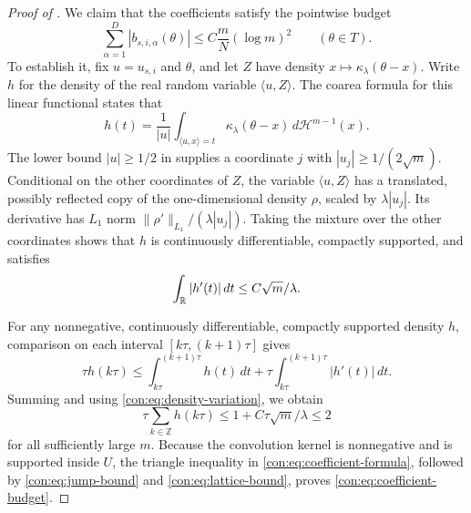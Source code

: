 \begin{proof}[Proof of ]
We claim that the coefficients satisfy the pointwise budget
\begin{equation}
  \sum_{\alpha=1}^D|b_{s,i,\alpha}(\theta)|
       \le C\frac{m}{N}(\log m)^2
       \qquad(\theta\in T).
  \label{con:eq:coefficient-budget}
\end{equation}
To establish it, fix $u=u_{s,i}$ and $\theta$, and let $Z$ have density
$x\mapsto\kappa_\lambda(\theta-x)$. Write $h$ for the density of the
real random variable $\langle u,Z\rangle$. The coarea formula for this
linear functional states that
\[
  h(t)=\frac{1}{|u|}
       \int_{\langle u,x\rangle=t}
       \kappa_\lambda(\theta-x)\,d\mathcal H^{m-1}(x).
\]
The lower bound $|u|\ge1/2$ in  supplies a coordinate
$j$ with $|u_j|\ge1/(2\sqrt m)$. Conditional on the other coordinates of
$Z$, the variable $\langle u,Z\rangle$ has a translated, possibly
reflected copy of the one-dimensional density $\rho$, scaled by
$\lambda|u_j|$. Its derivative has $L_1$ norm
$\|\rho'\|_{L_1}/(\lambda|u_j|)$. Taking the mixture over the other
coordinates shows that $h$ is continuously differentiable, compactly
supported, and satisfies
\begin{equation}
  \int_\mathbb R|h'(t)|\,dt\le C\sqrt m/\lambda.
  \label{con:eq:density-variation}
\end{equation}

For any nonnegative, continuously differentiable, compactly supported
density $h$, comparison on each interval $[k\tau,(k+1)\tau]$ gives
\[
  \tau h(k\tau)
     \le\int_{k\tau}^{(k+1)\tau}h(t)\,dt
       +\tau\int_{k\tau}^{(k+1)\tau}|h'(t)|\,dt.
\]
Summing and using \eqref{con:eq:density-variation}, we obtain
\begin{equation}
  \tau\sum_{k\in\mathbb Z}h(k\tau)
       \le1+C\tau\sqrt m/\lambda\le2
  \label{con:eq:lattice-bound}
\end{equation}
for all sufficiently large $m$. Because the convolution kernel is
nonnegative and is supported inside $U$, the triangle inequality in
\eqref{con:eq:coefficient-formula}, followed by
\eqref{con:eq:jump-bound} and \eqref{con:eq:lattice-bound}, proves
\eqref{con:eq:coefficient-budget}.


\end{proof}

